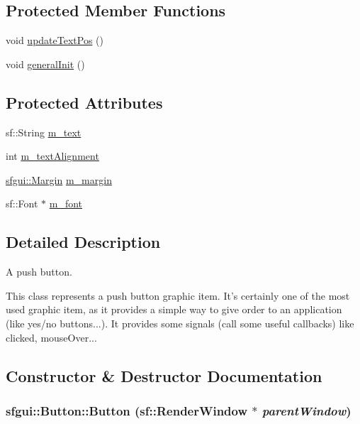 \subsection*{Protected Member Functions}
\begin{CompactItemize}
\item 
void \hyperlink{classsfgui_1_1Button_1e1eade317f3b603011067e4997b0725}{updateTextPos} ()
\item 
void \hyperlink{classsfgui_1_1Button_59849e58ed4c46061d71f7172cab4e4e}{generalInit} ()
\end{CompactItemize}
\subsection*{Protected Attributes}
\begin{CompactItemize}
\item 
sf::String \hyperlink{classsfgui_1_1Button_5a436a029fef79723eed0b024b5a7693}{m\_\-text}
\item 
int \hyperlink{classsfgui_1_1Button_b1ca3893cbff9b09f42e16377c0073f9}{m\_\-textAlignment}
\item 
\hyperlink{structsfgui_1_1Margin}{sfgui::Margin} \hyperlink{classsfgui_1_1Button_20ee48b44f31ad5b5de11dc3b00103a7}{m\_\-margin}
\item 
sf::Font $\ast$ \hyperlink{classsfgui_1_1Button_d3a2e16539c17bbbbaad6050a3a96de3}{m\_\-font}
\end{CompactItemize}


\subsection{Detailed Description}
A push button. 

This class represents a push button graphic item. It's certainly one of the most used graphic item, as it provides a simple way to give order to an application (like yes/no buttons...). It provides some signals (call some useful callbacks) like clicked, mouseOver... 

\subsection{Constructor \& Destructor Documentation}
\hypertarget{classsfgui_1_1Button_05c78461b775a073bed1e218586defd7}{
\subsubsection[Button]{\setlength{\rightskip}{0pt plus 5cm}sfgui::Button::Button (sf::RenderWindow $\ast$ {\em parentWindow})}}
\label{classsfgui_1_1Button_05c78461b775a073bed1e218586defd7}




